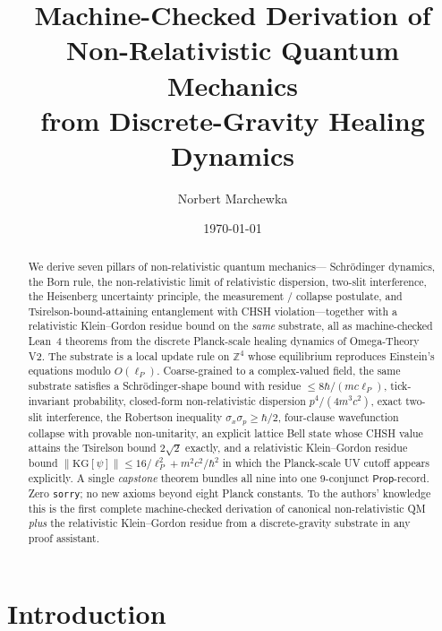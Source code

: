 \documentclass[aps,prl,twocolumn,superscriptaddress,nofootinbib,10pt]{revtex4-2}
\newcommand{\lP}{\ell_P}
\begin{document}
\title{Machine-Checked Derivation of Non-Relativistic Quantum Mechanics\\
  from Discrete-Gravity Healing Dynamics}

\author{Norbert Marchewka}

\date{\today}

\begin{abstract}
We derive seven pillars of non-relativistic quantum mechanics---
Schr\"odinger dynamics, the Born rule, the non-relativistic limit of
relativistic dispersion, two-slit interference, the Heisenberg
uncertainty principle, the measurement / collapse postulate, and
Tsirelson-bound-attaining entanglement with CHSH violation---together
with a relativistic Klein--Gordon residue bound on the \emph{same}
substrate, all as machine-checked Lean~4 theorems from the discrete
Planck-scale healing dynamics of Omega-Theory V2. The substrate is a
local update rule on $\mathbb{Z}^{4}$ whose equilibrium reproduces
Einstein's equations modulo $O(\lP)$. Coarse-grained to a
complex-valued field, the same substrate satisfies a
Schr\"odinger-shape bound with residue $\le 8\hbar/(mc\lP)$,
tick-invariant probability, closed-form non-relativistic dispersion
$p^{4}/(4m^{3}c^{2})$, exact two-slit interference, the Robertson
inequality $\sigma_{x}\sigma_{p}\ge\hbar/2$, four-clause wavefunction
collapse with provable non-unitarity, an explicit lattice Bell state
whose CHSH value attains the Tsirelson bound $2\sqrt{2}$ exactly, and
a relativistic Klein--Gordon residue bound
$\|\mathrm{KG}[\psi]\| \le 16/\lP^{2} + m^{2}c^{2}/\hbar^{2}$ in which
the Planck-scale UV cutoff appears explicitly. A single
\emph{capstone} theorem bundles all nine into one 9-conjunct
$\mathsf{Prop}$-record. Zero \texttt{sorry}; no new axioms beyond
eight Planck constants. To the authors' knowledge this is the first
complete machine-checked derivation of canonical non-relativistic QM
\emph{plus} the relativistic Klein--Gordon residue from a
discrete-gravity substrate in any proof assistant.
\end{abstract}

\maketitle

\section{Introduction}
\end{document}
